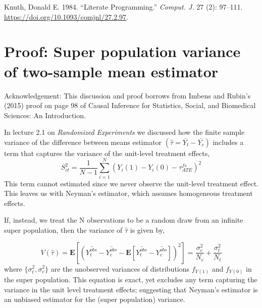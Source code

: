 \documentclass[
  letterpaper,
  DIV=11,
  numbers=noendperiod]{scrreprt}
\newlength{\cslhangindent}
\newenvironment{CSLReferences}[2] %
 {\begin{list}{}{%
  \setlength{\itemindent}{0pt}
  \setlength{\leftmargin}{0pt}
  \setlength{\parsep}{0pt}
  \ifodd #1
   \setlength{\leftmargin}{\cslhangindent}
   \setlength{\itemindent}{-1\cslhangindent}
  \fi
  \setlength{\itemsep}{#2\baselineskip}}}
 {\end{list}}
\theoremstyle{definition}
\theoremstyle{remark}
\begin{document}

\label{refs}
\begin{CSLReferences}{1}{0}
Knuth, Donald E. 1984. {``Literate Programming.''} \emph{Comput. J.} 27
(2): 97--111. \url{https://doi.org/10.1093/comjnl/27.2.97}.

\end{CSLReferences}

\chapter{Proof: Super population variance of two-sample mean
estimator}\label{proof-super-population-variance-of-two-sample-mean-estimator}

\begin{tcolorbox}[enhanced jigsaw, bottomrule=.15mm, arc=.35mm, toprule=.15mm, breakable, left=2mm, colframe=quarto-callout-tip-color-frame, leftrule=.75mm, colback=white, rightrule=.15mm, opacityback=0]

Acknowledgement: This discussion and proof borrows from Imbens and
Rubin's (2015) proof on page 98 of Causal Inference for Statistics,
Social, and Biomedical Sciences: An Introduction.

\end{tcolorbox}

In lecture 2.1 on \emph{Randomized Experiments} we discussed how the
finite sample variance of the difference between means estimator
\((\hat{\tau} = \bar{Y_t}− \bar{Y_c})\) includes a term that captures
the variance of the unit-level treatment effects, \[
S_{ct}^2=\frac{1}{N-1}\sum_{i=1}^N(Y_i(1)-Y_i(0)-\tau_{ATE}^{fs})^2
\] This term cannot estimated since we never observe the unit-level
treatment effect. This leaves us with Neyman's estimator, which assumes
homogeneous treatment effects.

If, instead, we treat the N observations to be a random draw from an
infinite super population, then the variance of \(\hat{\tau}\) is given
by,

\[
V(\hat{\tau})=\mathbf{E}[(\bar{Y_t^{obs}}-\bar{Y_c^{obs}}-\mathbf{E}[\bar{Y_t^{obs}}-\bar{Y_c^{obs}}])^2]=\frac{\sigma^2_c}{N_c}+\frac{\sigma^2_t}{N_t}
\] where \(\{\sigma_t^2,\sigma_c^2\}\) are the unobserved variances of
distributions \(f_{Y(1)}\) and \(f_{Y(0)}\) in the super population.
This equation is exact, yet excludes any term capturing the variance in
the unit level treatment effects; suggesting that Neyman's estimator is
an unbiased estimator for the (super population) variance.
\end{document}
